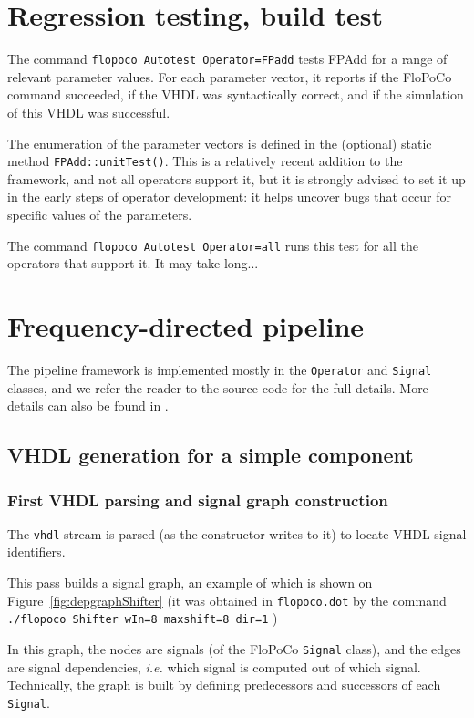 \documentclass{article}
\begin{document}
\section{Regression testing, build test }
The command \verb!flopoco Autotest Operator=FPadd! tests FPAdd for a range of relevant parameter values.
For each parameter vector, it reports if the FloPoCo command succeeded, if the VHDL was syntactically correct, and if the simulation of this VHDL was successful.

The enumeration of the parameter vectors is defined in the (optional) static method \texttt{FPAdd::unitTest()}.
This is a relatively recent addition to the framework, and not all operators support it, but it is strongly advised to set it up in the early steps of operator development: it helps uncover bugs that occur for specific values of the parameters.

The command \verb!flopoco Autotest Operator=all! runs this test for all the operators that support it.
It may take long...




\section{Frequency-directed pipeline \label{sec:pipeline}}

The  pipeline framework  is implemented mostly in the \texttt{Operator} and \texttt{Signal} classes, and we refer the reader to the source code for the full  details.
More details can also be found in \cite{istoan:hal-01373937}.

\subsection{VHDL generation for a simple component}

\subsubsection{First VHDL parsing and signal graph construction}
The \texttt{vhdl} stream is parsed (as the constructor writes to it) to locate VHDL signal identifiers.

This pass builds  a signal graph, an example of which is shown on Figure~\ref{fig:depgraphShifter} 
(it was obtained in \texttt{flopoco.dot} by the command
\verb!./flopoco Shifter wIn=8 maxshift=8 dir=1! )

In this graph, the nodes are signals (of the FloPoCo \texttt{Signal} class), and the edges are signal dependencies, \emph{i.e.} which signal is computed out of which signal.
Technically, the graph is built by defining predecessors and successors of each \texttt{Signal}.
\end{document}
